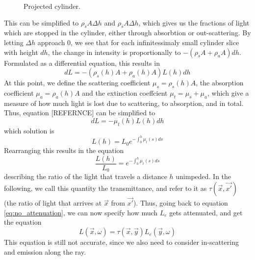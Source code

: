 \begin{figure}
\centering
\def\svgwidth{\columnwidth}


  \caption{\label{fig:projected_cylinder2}
         Projected cylinder.}
\end{figure}
This can be simplified to ${\rho}_sA{\Delta}h$ and ${\rho}_sA{\Delta}h$, which gives us the fractions of light which are stopped in the cylinder, either through absorbtion or out-scattering. By letting $\Delta h$ approach 0, we see that for each infinitessimaly small cylinder slice with height $dh$, the change in intensity is proportionally to $-({\rho}_sA + {\rho}_aA)dh$.
Formulated as a differential equation, this results in
\begin{equation}
dL = -({\rho}_s(h)A + {\rho}_a(h)A)L(h)dh
\end{equation}
At this point, we define the scattering coefficient ${\mu}_s ={\rho}_s(h)A $, the absorption coefficient ${\mu}_a = {\rho}_a(h)A$ and the extinction coeffcient ${\mu}_t = {\mu}_s +{\mu}_a$, which give a measure of how much light is lost due to scattering, to absorption, and in total. Thus, equation [REFERNCE] can be simplified to
\begin{equation}
dL = - {\mu}_t(h)L(h)dh
\end{equation}
which solution is
\begin{equation}
L(h) = L_0e^{-\int_{0}^{h} {\mu}_t(s)ds}
\end{equation}
Rearranging this results in the equation
\begin{equation}
\frac{L(h)}{L_0} = e^{-\int_{0}^{h} {\mu}_t(s)ds}
\end{equation}
describing the ratio of the light that travels a distance $h$ unimpeded. In the following, we call this quantity the transmittance, and refer to it as $\tau(\vec{x}, \vec{x'})$ (the ratio of light that arrives at $\vec{x}$ from $\vec{x'}$).
Thus, going back to equation \ref{eq:no_attenuation}, we can now specify how much $L_e$ gets attenuated, and get the equation
\begin{equation}
L(\vec{x},\omega ) =\tau(\vec{x}, \vec{y}) L_e(\vec{y}, \omega )
\end{equation}
This equation is still not accurate, since we also need to consider in-scattering and emission along the ray.
